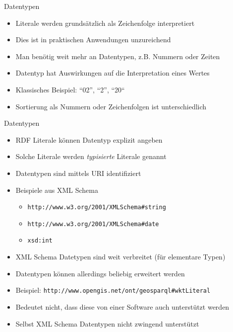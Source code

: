 \documentclass{beamer}
\begin{document}
\begin{frame}{Datentypen}
	
	\begin{itemize}
		\item Literale werden grundsätzlich als Zeichenfolge interpretiert
		\item Dies ist in praktischen Anwendungen unzureichend
		\item Man benötig weit mehr an Datentypen, z.B. Nummern oder Zeiten
		\item Datentyp hat Auswirkungen auf die Interpretation eines Wertes
		\item Klassisches Beispiel: ``02'', ``2'', ``20``
		\item Sortierung als Nummern oder Zeichenfolgen ist unterschiedlich
	\end{itemize}
	
\end{frame}

\begin{frame}{Datentypen}
	
	\begin{itemize}
		\item RDF Literale können Datentyp explizit angeben
		\item Solche Literale werden \emph{typisierte} Literale genannt
		\item Datentypen sind mittels URI identifiziert
		\item Beispiele aus XML Schema
		\begin{itemize}
			\item \texttt{http://www.w3.org/2001/XMLSchema\#string}
			\item \texttt{http://www.w3.org/2001/XMLSchema\#date}
			\item \texttt{xsd:int}
		\end{itemize}
		\item XML Schema Datetypen sind weit verbreitet (für elementare Typen)
		\item Datentypen können allerdings beliebig erweitert werden
		\item Beispiel: \texttt{http://www.opengis.net/ont/geosparql\#wktLiteral}
		\item Bedeutet nicht, dass diese von einer Software auch unterstützt werden
		\item Selbst XML Schema Datentypen nicht zwingend unterstützt
	\end{itemize}
	
\end{frame}
\end{document}
